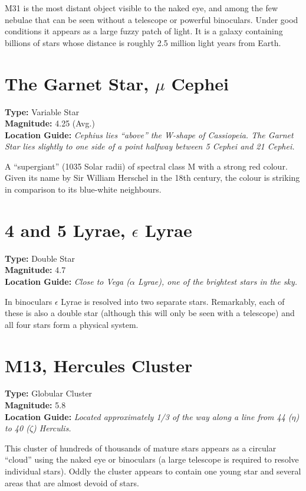 M31 is the most distant object visible to the naked eye, and among the
few nebulae that can be seen without a telescope or powerful binoculars. Under good conditions it appears as a large fuzzy patch of light. It is a galaxy containing billions of stars whose distance is roughly 2.5 million light years from Earth.

\section{The Garnet Star, \texorpdfstring{$\mu$}{mu} Cephei}
\textbf{Type:} Variable Star \\
\textbf{Magnitude:} 4.25 (Avg.) \\
\textbf{Location Guide:} \textit{Cephius lies ``above'' the W-shape of Cassiopeia. The Garnet Star lies slightly to one side of a point halfway between 5 Cephei and 21 Cephei.}

A ``supergiant'' (1035 Solar radii) of spectral class M with a strong red colour. Given its name by Sir William Herschel in the 18th century, the colour is striking in comparison to its blue-white neighbours.

\section{4 and 5 Lyrae, \texorpdfstring{$\epsilon$}{epsilon} Lyrae}
\textbf{Type:} Double Star \\
\textbf{Magnitude:} 4.7 \\
\textbf{Location Guide:} \textit{Close to Vega ($\alpha$ Lyrae), one of the brightest stars in the sky.}

In binoculars $\epsilon$ Lyrae is resolved into two separate
stars. Remarkably, each of these is also a double star (although this
will only be seen with a telescope) and all four stars form a physical
system.

\section{M13, Hercules Cluster} 
\textbf{Type:} Globular Cluster \\ 
\textbf{Magnitude:} 5.8 \\
\textbf{Location Guide:} \textit{Located approximately 1/3 of the way along a line from 44 ($\eta$) to 40 ($\zeta$) Herculis.}

This cluster of hundreds of thousands of mature stars appears as
a circular ``cloud'' using the naked eye or binoculars (a large
telescope is required to resolve individual stars). Oddly the cluster
appears to contain one young star and several areas that are almost
devoid of stars.

